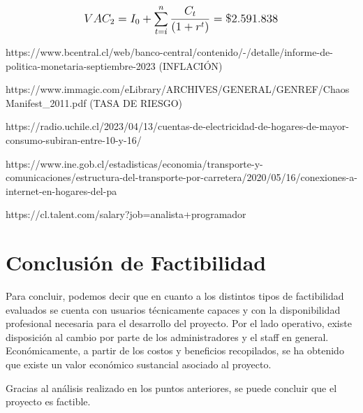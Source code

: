 \[
\mathlarger{
	{VAC_2} = I_0 + \sum\limits_{t=i}^{n}\frac{C_t}{\left(1+r^t\right)} = \$2.591.838
}
\]

https://www.bcentral.cl/web/banco-central/contenido/-/detalle/informe-de-politica-monetaria-septiembre-2023 (INFLACIÓN)

https://www.immagic.com/eLibrary/ARCHIVES/GENERAL/GENREF/ChaosManifest\_2011.pdf (TASA DE RIESGO)

https://radio.uchile.cl/2023/04/13/cuentas-de-electricidad-de-hogares-de-mayor-consumo-subiran-entre-10-y-16/

https://www.ine.gob.cl/estadisticas/economia/transporte-y-comunicaciones/estructura-del-transporte-por-carretera/2020/05/16/conexiones-a-internet-en-hogares-del-pa%

https://cl.talent.com/salary?job=analista+programador

\section{Conclusión de Factibilidad}
Para concluir, podemos decir que en cuanto a los distintos tipos de factibilidad evaluados se cuenta con usuarios técnicamente capaces y con la disponibilidad profesional necesaria para el desarrollo del proyecto. Por el lado operativo, existe disposición al cambio por parte de los administradores y el staff en general. Económicamente, a partir de los costos y beneficios recopilados, se ha obtenido que existe un valor económico sustancial asociado al proyecto.

Gracias al análisis realizado en los puntos anteriores, se puede concluir que el proyecto es factible.

